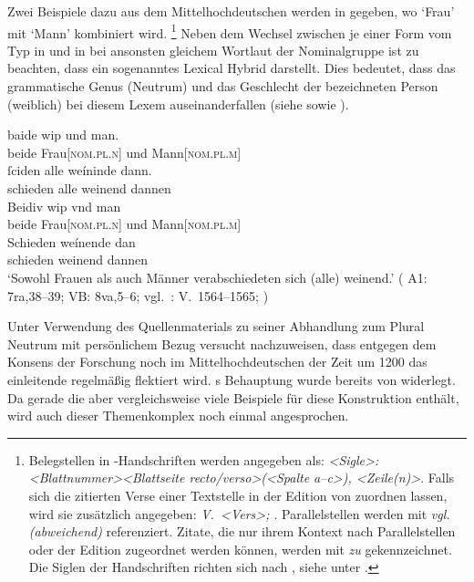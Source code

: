 Zwei Beispiele dazu aus dem Mittelhochdeutschen werden in
 gegeben, wo  `Frau' mit 
`Mann' kombiniert wird.%
%
	\footnote{Belegstellen in \KC{}-Handschriften werden angegeben als:
		\textit{<Sigle>: <Blattnummer><Blattseite recto/verso>(<Spalte a--c>),%
		<Zeile(n)>}. Falls sich die zitierten Verse einer Textstelle in der
		Edition von \citet{schroeder1895} zuordnen lassen, wird sie zusätzlich
		angegeben: \textit{V.~<Vers>; \cite[<Seite>]{schroeder1895}}.
		Parallelstellen werden mit \textit{vgl. (abweichend)} referenziert.
		Zitate, die nur ihrem Kontext nach Parallelstellen oder der Edition
		zugeordnet werden können, werden mit \textit{zu} gekennzeichnet. Die
		Siglen der Handschriften richten sich nach , siehe
		unter \nocite{kcdigital}.%
	}
%
Neben dem Wechsel zwischen je einer Form vom Typ  in
 und  in  bei
ansonsten gleichem Wortlaut der Nominalgruppe ist zu beachten, dass 
ein sogenanntes Lexical Hybrid darstellt. Dies bedeutet, dass das grammatische
Genus (Neutrum) und das Geschlecht der bezeichneten Person (weiblich) bei
diesem Lexem auseinanderfallen (siehe  sowie
\cite[183--184]{corbett1991}).

\begin{exe}
\ex \label{ex:mhgbeideunde}
	\begin{xlist}
	\ex \label{ex:mhgbeideunde_1}
		\gll baide wip und man. \\
			beide Frau[\textsc{nom.pl.n}] und Mann[\textsc{nom.pl.m}] \\
	\sn \gll ſciden alle weíninde dann. \\
			schieden alle weinend dannen \\

	\ex \label{ex:mhgbeideunde_2}
		\gll Beidiv wip vnd man \\
			beide Frau[\textsc{nom.pl.n}] und Mann[\textsc{nom.pl.m}] \\
	\sn \gll Schieden weínende dan \\
			schieden weinend dannen \\
		\trans `Sowohl Frauen als auch Männer verabschiedeten sich (alle)
			weinend.'
			(%
				A1: 7ra,38--39;
				VB: 8va,5--6;
				vgl.~\KC: V.~1564--1565; \cite[110]{schroeder1895}%
			)
	\end{xlist}
\end{exe}

Unter Verwendung des Quellenmaterials zu seiner Abhandlung zum Plural Neutrum
mit persönlichem Bezug \autocite{askedal1973} versucht \citet{askedal1974}
nachzuweisen, dass entgegen dem Konsens der Forschung
\autocites[vgl.~z.\,B.][433]{behaghel1923}[133]{dal2014}[626]{ksw2} noch im
Mittelhochdeutschen der Zeit um 1200 das einleitende
 regelmäßig flektiert wird. \citeauthor{askedal1974}s Behauptung
wurde bereits von \citet{gjelsten1980} widerlegt. Da gerade die \KC{} aber
vergleichsweise viele Beispiele für diese Konstruktion enthält, wird auch
dieser Themenkomplex noch einmal angesprochen.

